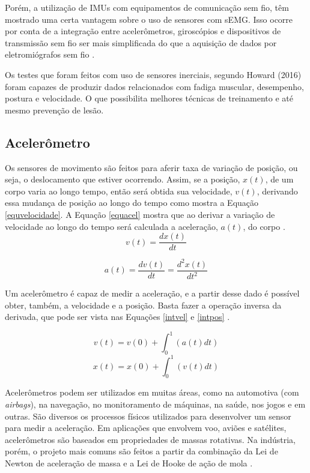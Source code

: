 		Porém, a utilização de IMUs com equipamentos de comunicação sem fio, têm mostrado uma certa vantagem sobre o uso de sensores com sEMG. Isso ocorre por conta de a integração entre acelerômetros, giroscópios e dispositivos de transmissão sem fio ser mais simplificada do que a aquisição de dados por eletromiógrafos sem fio \cite{howard2016}. 
		
		Os testes que foram feitos com uso de sensores inerciais, segundo  Howard (2016) foram capazes de produzir dados relacionados com fadiga muscular, desempenho, postura e velocidade. O que possibilita melhores técnicas de treinamento e até mesmo prevenção de lesão.

			\subsection{Acelerômetro}
			
				Os sensores de movimento são feitos para aferir taxa de variação de posição, ou seja, o deslocamento que estiver ocorrendo. Assim, se a posição, $x(t)$, de um corpo varia ao longo tempo, então será obtida sua velocidade, $v(t)$,  derivando essa mudança de posição ao longo do tempo como mostra a Equação \ref{equvelocidade}. A Equação \ref{equacel} mostra que ao derivar a variação de velocidade ao longo do tempo será calculada a aceleração, $a(t)$, do corpo \cite{moyses2013}.
				\begin{equation}
				v(t) = \frac{dx(t)}{dt}
				\label{equvelocidade}
				\end{equation}
				
				\begin{equation}
				a(t) = \frac{dv(t)}{dt} = \frac{d^2x(t)}{dt^2} 
				\label{equacel}
				\end{equation}
				
				Um acelerômetro é capaz de medir a aceleração, e a partir desse dado é possível obter, também, a velocidade e a posição. Basta fazer a operação inversa da derivada, que pode ser vista nas Equações \ref{intvel} e \ref{intpos} \cite{moyses2013}.
				
				\begin{equation}
				v(t) = v(0) + \int_{0}^{1}(a(t)dt)
				\label{intvel}
				\end{equation}
				\begin{equation}
				x(t) = x(0) + \int_{0}^{1}(v(t)dt)
				\label{intpos}
				\end{equation}
				
				Acelerômetros podem ser utilizados em muitas áreas, como na  automotiva (com \textit{airbags}), na navegação, no monitoramento de máquinas, na saúde, nos jogos e em outras. São diversos os processos físicos utilizados para desenvolver um sensor para medir a aceleração. Em aplicações que envolvem voo, aviões e satélites,
				acelerômetros são baseados em propriedades de massas rotativas. Na indústria,
				porém, o projeto mais comuns são feitos a partir da combinação da Lei de Newton de
				aceleração de massa e a Lei de Hooke de ação de mola \cite{carneiro2003}.
				
